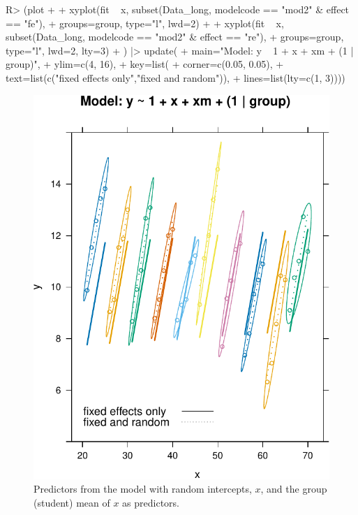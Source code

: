 \documentclass[
]{jss}
\begin{document}
\begin{CodeChunk}
\begin{CodeInput}
R> (plot +
+   xyplot(fit ~ x, subset(Data_long, modelcode == "mod2" & effect == "fe"),
+          groups=group, type="l", lwd=2) +
+   xyplot(fit ~ x, subset(Data_long, modelcode == "mod2" & effect == "re"),
+          groups=group, type="l", lwd=2, lty=3)
+ ) |> update(
+   main="Model: y ~ 1 + x + xm + (1 | group)",
+   ylim=c(4, 16),
+   key=list(
+     corner=c(0.05, 0.05),
+     text=list(c("fixed effects only","fixed and random")),
+     lines=list(lty=c(1, 3))))
\end{CodeInput}
\begin{figure}

{\centering \includegraphics[width=1\linewidth]{JSS-article-reduced_files/figure-latex/plot-fits-mod2-1} 

}

\caption[Predictors from the model with random intercepts, $x$, and the group (student) mean of $x$ as predictors]{Predictors from the model with random intercepts, $x$, and the group (student) mean of $x$ as predictors.}\label{fig:plot-fits-mod2}
\end{figure}
\end{CodeChunk}
\end{document}
